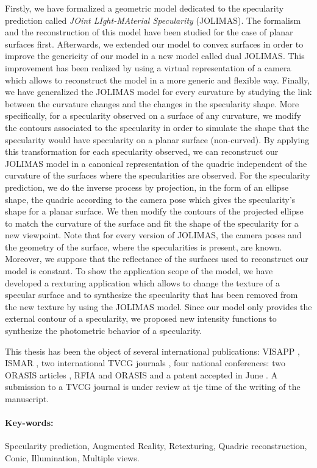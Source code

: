 Firstly, we have formalized a geometric model dedicated to the specularity prediction called \textit{JOint LIght-MAterial Specularity} (JOLIMAS). The formalism and the reconstruction of this model have been studied for the case of planar surfaces first. Afterwards, we extended our model to convex surfaces in order to improve the genericity of our model in a new model called dual JOLIMAS. This improvement has been realized by using a virtual representation of a camera which allows to reconstruct the model in a more generic and flexible way. Finally, we have generalized the \mbox{JOLIMAS} model for every curvature by studying the link between the curvature changes and the changes in the specularity shape. More specifically, for a specularity observed on a surface of any curvature, we modify the contours associated to the specularity in order to simulate the shape that the specularity would have specularity on a planar surface (non-curved). By applying this transformation for each specularity observed, we can reconstruct our JOLIMAS model in a canonical representation of the quadric independent of the curvature of the surfaces where the specularities are observed. For the specularity prediction, we do the inverse process by projection, in the form of an ellipse shape, the quadric according to the camera pose which gives the specularity's shape for a planar surface. We then modify the contours of the projected ellipse to match the curvature of the surface and fit the shape of the specularity for a new viewpoint.
Note that for every version of JOLIMAS, the camera poses and the geometry of the surface, where the specularities is present, are known. Moreover, we suppose that the reflectance of the surfaces used to reconstruct our model is constant.   To show the application scope of the model, we have developed a rexturing application which allows to change the texture of a specular surface and to synthesize the specularity that has been removed from the new texture by using the JOLIMAS model. Since our model only provides the external contour of a specularity, we proposed new intensity functions to synthesize the photometric behavior of a specularity.

This thesis has been the object of several international publications: VISAPP \citeyearpar{morgand2014generic}, ISMAR \citeyearpar{morgand2016empirical, morgand2017multipleview}, two international TVCG journals \citeyearpar{morgand2017amultiple, morgand2017multiple}, four national conferences: two ORASIS articles \citeyearpar{morgand2015reconstruction, morgand2015detection}, RFIA \citeyearpar{morgand2015modele} and ORASIS \citeyearpar{morgand2017modele} and a patent accepted in June \citeyearpar{tamaazousti2018method}. A submission to a TVCG journal is under review at tje time of the writing of the manuscript.

\paragraph{Key-words:} Specularity prediction, Augmented Reality, Retexturing, Quadric reconstruction, Conic, Illumination, Multiple views.

